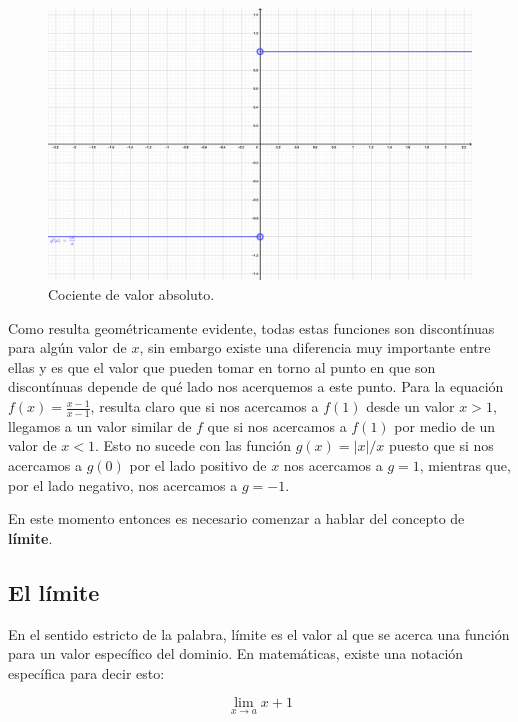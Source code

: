 \documentclass[
]{book}
\begin{document}
\begin{figure}

{\centering \includegraphics{Unidad-III/Deriv-absol} 

}

\caption{Cociente de valor absoluto.}\label{fig:absol}
\end{figure}

Como resulta geométricamente evidente, todas estas funciones son discontínuas para algún valor de \(x\), sin embargo existe una diferencia muy importante entre ellas y es que el valor que pueden tomar en torno al punto en que son discontínuas depende de qué lado nos acerquemos a este punto. Para la equación \(f(x) = \frac{x-1}{x-1}\), resulta claro que si nos acercamos a \(f(1)\) desde un valor \(x>1\), llegamos a un valor similar de \(f\) que si nos acercamos a \(f(1)\) por medio de un valor de \(x < 1\). Esto no sucede con las función \(g(x) = |x|/x\) puesto que si nos acercamos a \(g(0)\) por el lado positivo de \(x\) nos acercamos a \(g = 1\), mientras que, por el lado negativo, nos acercamos a \(g = -1\).

En este momento entonces es necesario comenzar a hablar del concepto de \textbf{límite}.

\hypertarget{el-luxedmite}{%
\subsection{El límite}\label{el-luxedmite}}

En el sentido estricto de la palabra, límite es el valor al que se acerca una función para un valor específico del dominio. En matemáticas, existe una notación específica para decir esto:

\begin{equation}
\lim \limits_{x \rightarrow a} x + 1
\end{equation}
\end{document}
